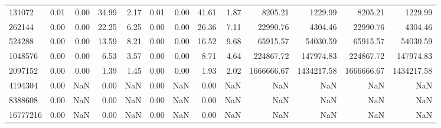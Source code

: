 \begin{tabular}{lrrrrrrrrrrrr}
131072 & 0.01 & 0.00 & 34.99 & 2.17 & 0.01 & 0.00 & 41.61 & 1.87 & 8205.21 & 1229.99 & 8205.21 & 1229.99 \\
262144 & 0.00 & 0.00 & 22.25 & 6.25 & 0.00 & 0.00 & 26.36 & 7.11 & 22990.76 & 4304.46 & 22990.76 & 4304.46 \\
524288 & 0.00 & 0.00 & 13.59 & 8.21 & 0.00 & 0.00 & 16.52 & 9.68 & 65915.57 & 54030.59 & 65915.57 & 54030.59 \\
1048576 & 0.00 & 0.00 & 6.53 & 3.57 & 0.00 & 0.00 & 8.71 & 4.64 & 224867.72 & 147974.83 & 224867.72 & 147974.83 \\
2097152 & 0.00 & 0.00 & 1.39 & 1.45 & 0.00 & 0.00 & 1.93 & 2.02 & 1666666.67 & 1434217.58 & 1666666.67 & 1434217.58 \\
4194304 & 0.00 & NaN & 0.00 & NaN & 0.00 & NaN & 0.00 & NaN & NaN & NaN & NaN & NaN \\
8388608 & 0.00 & NaN & 0.00 & NaN & 0.00 & NaN & 0.00 & NaN & NaN & NaN & NaN & NaN \\
16777216 & 0.00 & NaN & 0.00 & NaN & 0.00 & NaN & 0.00 & NaN & NaN & NaN & NaN & NaN \\
\bottomrule
\end{tabular}
